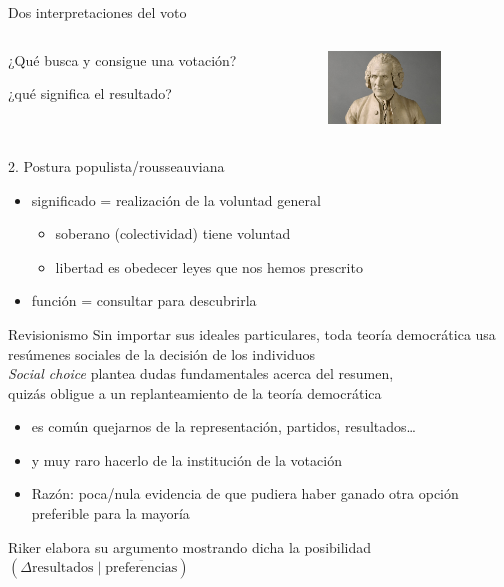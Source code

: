 \documentclass[bigger]{beamer}
\begin{document}
\begin{frame}[label={sec:orgbbb1839}]{Dos interpretaciones del voto}
\begin{columns}
\begin{column}{0.6\columnwidth}
¿Qué busca y consigue una votación?

¿qué significa el resultado?
\end{column}

\begin{column}{0.4\columnwidth}
\includegraphics[width=3cm]{./pics/rousseau.jpg}
\bigskip
\end{column}
\end{columns}
\begin{block}{2. Postura populista/rousseauviana}
\begin{itemize}
\item significado = realización de la voluntad general
\begin{itemize}
\item soberano (colectividad) tiene voluntad
\item libertad es obedecer leyes que nos hemos prescrito
\end{itemize}
\item función = consultar para descubrirla
\end{itemize}
\end{block}
\end{frame}
\begin{frame}[label={sec:orgec04934}]{Revisionismo}
Sin importar sus ideales particulares, toda teoría democrática usa \alert{resúmenes sociales} de la decisión de los individuos \\[0pt]
\bigskip
\emph{Social choice} plantea dudas fundamentales acerca del \alert{resumen}, \\[0pt]
quizás obligue a un replanteamiento de la teoría democrática
\bigskip \pause
\begin{itemize}
\item es común quejarnos de la representación, partidos, resultados\ldots{}
\item y muy raro hacerlo de la institución de la \alert{votación}
\item Razón: poca/nula evidencia de que pudiera haber ganado otra opción preferible para la mayoría \\[0pt]
\end{itemize}
\begin{block}{Riker elabora su argumento mostrando dicha la posibilidad}
\centering
\((\Delta \text{resultados} \;|\; \overline{\text{preferencias}})\)
\end{block}
\end{frame}
\end{document}
